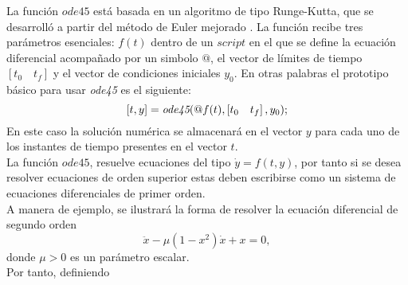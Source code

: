 \newpage
{}\label{anexoB}
La función $ode45$ está basada en un algoritmo de tipo Runge-Kutta, que se desarrolló a partir del método de Euler mejorado . La función recibe tres parámetros esenciales: $f(t)$ dentro de un $script$ en el que se define la ecuación diferencial acompañado por un simbolo $@$, el vector de límites de tiempo $\left[ t_0 \quad t_f \right]$ y el vector de condiciones iniciales $y_0$. En otras palabras el prototipo básico para usar \emph{ode45} es el siguiente:
\begin{equation}\label{defode}
   [t,y]=\emph{ode45}(@f(t),\left[ t_0 \quad t_f \right],y_0);
    \end{equation}
En este caso la solución numérica se almacenará en el vector $y$  para cada uno de los instantes de tiempo presentes en el vector $t$.\\

La función $ode45$, resuelve ecuaciones del tipo $\dot{y} = f(t,y)$, por tanto si se desea resolver ecuaciones de orden superior estas deben escribirse como un sistema de ecuaciones diferenciales de primer orden.\\

A manera de ejemplo, se ilustrará la forma de resolver la ecuación diferencial de segundo orden
\begin{equation}\label{segundo}
   \ddot{x}-\mu\left(1-x^2\right)\dot{x}+x=0,
\end{equation}
donde $\mu > 0$ es un parámetro escalar.\\

\noindent Por tanto, definiendo


